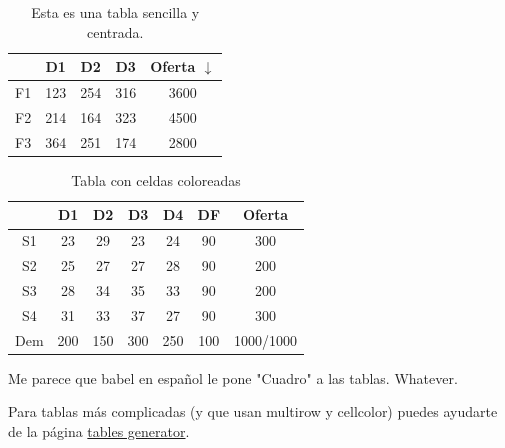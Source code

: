 \documentclass[12pt]{article} %
\begin{document}
\begin{table}[H]
  \centering
  \caption{Esta es una tabla sencilla y centrada.}
  \label{tab:EjemploSencillo}
  \begin{tabular}{c|ccc|c}
    & D1 & D2 & D3 & Oferta $\downarrow$ \\
    \hline
    F1 & 123 & 254 & 316 & 3600 \\
    F2 & 214 & 164 & 323 & 4500 \\
    F3 & 364 & 251 & 174 & 2800 \\
    \hline
  \end{tabular}
\end{table}

\begin{table}[H]
\centering
\caption{Tabla con celdas coloreadas}
\label{tab:colorCell}
\begin{tabular}{c|ccccc|c}
& D1 & D2 & D3 & D4 & DF & Oferta \\
\hline
S1 & 23 & 29 & 23 & 24 & \cellcolor{orange} 90 & 300 \\
S2 & 25 & 27 & 27 & 28 & \cellcolor{orange} 90 & 200 \\
S3 & 28 & 34 & 35 & 33 & \cellcolor{orange} 90 & 200 \\
S4 & 31 & 33 & 37 & 27 & \cellcolor{orange} 90 & 300 \\
\hline
Dem & 200 & 150 & 300 & 250 & \cellcolor{orange} 100 & \mbox{1000/1000} 
\end{tabular}
\end{table}

Me parece que babel en español le pone "Cuadro" a las tablas. Whatever. 

Para tablas más complicadas (y que usan multirow y cellcolor) puedes ayudarte de la página \href{https://www.tablesgenerator.com}{tables generator}.
\end{document}
